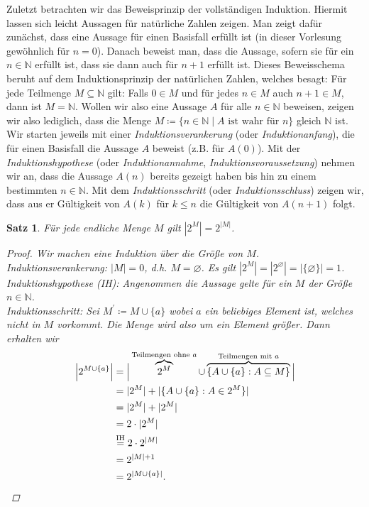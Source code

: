 \documentclass[11pt, a4paper]{article}
\theoremstyle{definition}
\theoremstyle{plain}
\newtheorem{theorem}[definition]{Satz}
\numberwithin{equation}{section}
\let\emptyset\varnothing
\begin{document}
Zuletzt betrachten wir das Beweisprinzip der vollständigen Induktion. Hiermit lassen sich leicht Aussagen für natürliche Zahlen zeigen. Man zeigt dafür zunächst, dass eine Aussage für einen Basisfall erfüllt ist (in dieser Vorlesung gewöhnlich für $n = 0$). Danach beweist man, dass die Aussage, sofern sie für ein $n \in \mathbb{N}$ erfüllt ist, dass sie dann auch für $n+1$ erfüllt ist. Dieses Beweisschema beruht auf dem Induktionsprinzip der natürlichen Zahlen, welches besagt: Für jede Teilmenge $M \subseteq \mathbb{N}$ gilt: Falls $0 \in M$ und für jedes $n \in M$ auch $n+1 \in M$, dann ist $M = \mathbb{N}$. Wollen wir also eine Aussage $A$ für alle $n \in \mathbb{N}$ beweisen, zeigen wir also lediglich, dass die Menge $M \coloneqq \{n \in \mathbb{N} \mid A \text{ ist wahr für } n\}$ gleich $\mathbb{N}$ ist. Wir starten jeweils mit einer \textit{Induktionsverankerung} (oder \textit{Induktionanfang}), die für einen Basisfall die Aussage $A$ beweist (z.B. für $A(0)$). Mit der \textit{Induktionshypothese} (oder \textit{Induktionannahme}, \textit{Induktionsvoraussetzung}) nehmen wir an, dass die Aussage $A(n)$ bereits gezeigt haben bis hin zu einem bestimmten $n \in \mathbb{N}$. Mit dem \textit{Induktionsschritt} (oder \textit{Induktionsschluss}) zeigen wir, dass aus er Gültigkeit von $A(k)$ für $k \leq n$ die Gültigkeit von $A(n+1)$ folgt.
\begin{theorem}
	Für jede endliche Menge $M$ gilt $|2^M| = 2^{|M|}$.
	\begin{proof}
		Wir machen eine Induktion über die Größe von $M$.\\
		Induktionsverankerung: $|M| = 0$, d.h. $M = \emptyset$. Es gilt $|2^M| = |2^\emptyset| = |\{\emptyset\}| = 1$. \checkmark\\
		Induktionshypothese (IH): Angenommen die Aussage gelte für ein $M$ der Größe $n \in \mathbb{N}$.\\
		Induktionsschritt: Sei $M^\prime \coloneqq M \cup \{a\}$ wobei $a$ ein beliebiges Element ist, welches nicht in $M$ vorkommt. Die Menge wird also um ein Element größer. Dann erhalten wir
		\begin{align*}
			\Big| 2^{M \cup \{a\}} \Big| &= \Big| \overbrace{2^M}^{\text{Teilmengen ohne } a} \cup \overbrace{\{A \cup \{a\} : A \subseteq M \}}^{\text{Teilmengen mit } a} \Big|\\
			&= |2^M| + |\{A \cup \{a\} : A \in 2^M \}|\\
			&= |2^M| + |2^M|\\
			&= 2 \cdot |2^M|\\
			&\overset{\text{IH}}{=} 2\cdot 2^{|M|}\\
			&= 2^{|M|+1}\\
			&= 2^{|M \cup \{a\}|}. \qedhere
		\end{align*}
	\end{proof}
\end{theorem}
\end{document}
